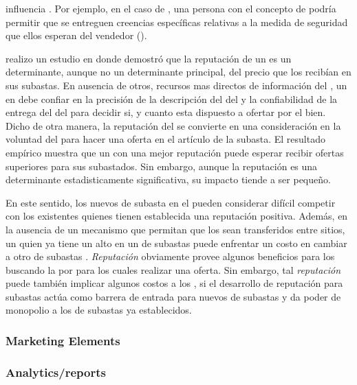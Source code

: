 \security influencia \trust. Por ejemplo, en el caso de \amazon, una persona \familiarity con el concepto de \secureintcom podría permitir que se entreguen creencias específicas relativas a la medida de seguridad que ellos esperan del vendedor (\trust)\cite{gefen2000commerce}.

\ebay realizo un estudio en donde demostró que la reputación \ecommerce de un \seller es un determinante, aunque no un determinante principal, del precio que los \sellers recibían en sus subastas. En ausencia de otros, recursos mas directos de información del \itemsCommerce, un \consumer en \internet debe confiar en la precisión de la descripción del \itemsCommerce del \sellers y la confiabilidad de la entrega del \itemsCommerce del \sellers para decidir si, y cuanto esta dispuesto a ofertar por el bien. Dicho de otra manera, la reputación del \sellers se convierte en una consideración en la voluntad del \consumer para hacer una oferta en el artículo de la subasta. El resultado empírico muestra que un \seller con una mejor reputación puede esperar recibir ofertas superiores para sus \itemsCommerce subastados. Sin embargo, aunque la reputación es una determinante estadisticamente significativa, su impacto tiende a ser pequeño\cite{melnik2002does}.

En este sentido, los nuevos \seller de subasta en el \websites pueden considerar difícil competir con los \sellers existentes quienes tienen establecida una reputación positiva. Además, en la ausencia de un mecanismo que permitan que los \ratings sean transferidos entre sitios, un \seller quien ya tiene un alto \rating en un \websiteINT de subastas \online puede enfrentar un costo en cambiar a otro \websiteINT de subastas \online. \textit{Reputación} obviamente provee algunos beneficios para los \consumers buscando la \internet por \itemsCommerce para los cuales realizar una oferta. Sin embargo, tal \textit{reputación} puede también implicar algunos costos a los \consumers, si el desarrollo de reputación para subastas \online actúa como barrera de entrada para nuevos \websites de  subastas \online  y da poder de monopolio a los \websites de subastas \online ya establecidos\cite{melnik2002does}.

\subsubsection{Marketing Elements}

\subsubsection{Analytics/reports}





